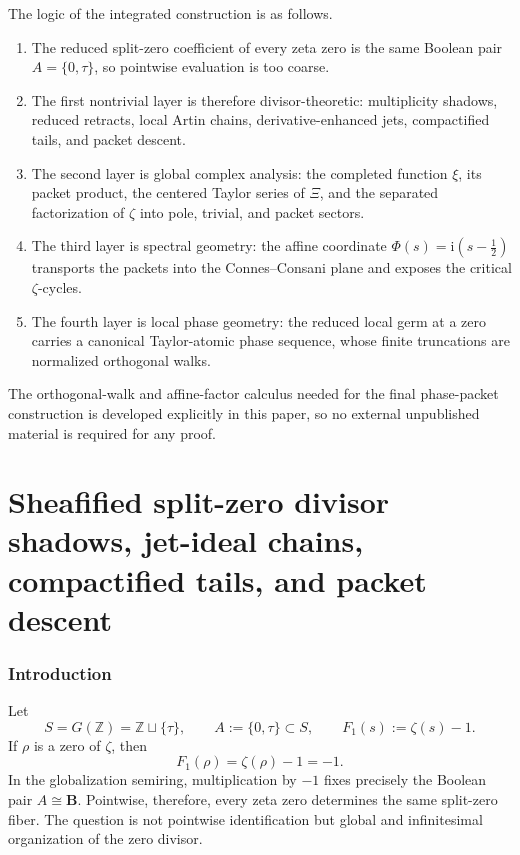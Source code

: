 \documentclass[11pt,a4paper]{article}
\numberwithin{equation}{section}
\theoremstyle{definition}
\theoremstyle{remark}
\newcommand{\ZZ}{\mathbb Z}
\newcommand{\BB}{\mathbf B}
\newcommand{\taup}{\tau}
\newcommand{\ii}{\mathrm i}
\newcommand{\setpartprefix}[1]{\def\partprefix{#1}\setcounter{section}{0}}
\def\partprefix{0}
\begin{document}
The logic of the integrated construction is as follows.

\begin{enumerate}[label=(\arabic*)]
\item The reduced split-zero coefficient of every zeta zero is the same Boolean pair $A=\{0,\taup\}$, so pointwise evaluation is too coarse.
\item The first nontrivial layer is therefore divisor-theoretic: multiplicity shadows, reduced retracts, local Artin chains, derivative-enhanced jets, compactified tails, and packet descent.
\item The second layer is global complex analysis: the completed function $\xi$, its packet product, the centered Taylor series of $\Xi$, and the separated factorization of $\zeta$ into pole, trivial, and packet sectors.
\item The third layer is spectral geometry: the affine coordinate $\Phi(s)=\ii(s-\tfrac12)$ transports the packets into the Connes--Consani plane and exposes the critical $\zeta$-cycles.
\item The fourth layer is local phase geometry: the reduced local germ at a zero carries a canonical Taylor-atomic phase sequence, whose finite truncations are normalized orthogonal walks.
\end{enumerate}

The orthogonal-walk and affine-factor calculus needed for the final phase-packet construction is developed explicitly in this paper, so no external unpublished material is required for any proof.
\part{Sheafified split-zero divisor shadows, jet-ideal chains, compactified tails, and packet descent}
\setpartprefix{I}

\section{Introduction}

Let
\[
S=G(\ZZ)=\ZZ\sqcup\{\taup\},\qquad A:=\{0,\taup\}\subset S,
\qquad F_1(s):=\zeta(s)-1.
\]
If $\rho$ is a zero of $\zeta$, then
\[
F_1(\rho)=\zeta(\rho)-1=-1.
\]
In the globalization semiring, multiplication by $-1$ fixes precisely the Boolean pair $A\cong\BB$.  Pointwise, therefore, every zeta zero determines the same split-zero fiber.  The question is not pointwise identification but global and infinitesimal organization of the zero divisor.
\end{document}
